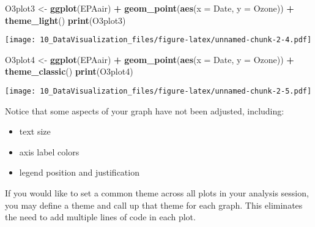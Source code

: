 \documentclass[]{article}
\newenvironment{Shaded}{\begin{snugshade}}{\end{snugshade}}
\newcommand{\KeywordTok}[1]{\textcolor[rgb]{0.13,0.29,0.53}{\textbf{#1}}}
\newcommand{\DataTypeTok}[1]{\textcolor[rgb]{0.13,0.29,0.53}{#1}}
\newcommand{\StringTok}[1]{\textcolor[rgb]{0.31,0.60,0.02}{#1}}
\newcommand{\OperatorTok}[1]{\textcolor[rgb]{0.81,0.36,0.00}{\textbf{#1}}}
\newcommand{\NormalTok}[1]{#1}
\providecommand{\tightlist}{%
  \setlength{\itemsep}{0pt}\setlength{\parskip}{0pt}}
\begin{document}
\begin{Shaded}
\begin{Highlighting}[]
\NormalTok{O3plot3 <-}\StringTok{ }\KeywordTok{ggplot}\NormalTok{(EPAair) }\OperatorTok{+}
\StringTok{  }\KeywordTok{geom_point}\NormalTok{(}\KeywordTok{aes}\NormalTok{(}\DataTypeTok{x =}\NormalTok{ Date, }\DataTypeTok{y =}\NormalTok{ Ozone)) }\OperatorTok{+}
\StringTok{  }\KeywordTok{theme_light}\NormalTok{()}
\KeywordTok{print}\NormalTok{(O3plot3)}
\end{Highlighting}
\end{Shaded}

\texttt{[image: 10\_DataVisualization\_files/figure-latex/unnamed-chunk-2-4.pdf]}

\begin{Shaded}
\begin{Highlighting}[]
\NormalTok{O3plot4 <-}\StringTok{ }\KeywordTok{ggplot}\NormalTok{(EPAair) }\OperatorTok{+}
\StringTok{  }\KeywordTok{geom_point}\NormalTok{(}\KeywordTok{aes}\NormalTok{(}\DataTypeTok{x =}\NormalTok{ Date, }\DataTypeTok{y =}\NormalTok{ Ozone)) }\OperatorTok{+}
\StringTok{  }\KeywordTok{theme_classic}\NormalTok{()}
\KeywordTok{print}\NormalTok{(O3plot4)}
\end{Highlighting}
\end{Shaded}

\texttt{[image: 10\_DataVisualization\_files/figure-latex/unnamed-chunk-2-5.pdf]}

Notice that some aspects of your graph have not been adjusted,
including:

\begin{itemize}
\tightlist
\item
  text size
\item
  axis label colors
\item
  legend position and justification
\end{itemize}

If you would like to set a common theme across all plots in your
analysis session, you may define a theme and call up that theme for each
graph. This eliminates the need to add multiple lines of code in each
plot.
\end{document}
